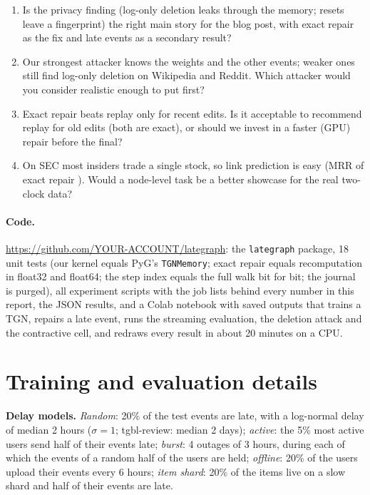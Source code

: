 \documentclass{article}
\newcommand{\CodeURL}{https://github.com/YOUR-ACCOUNT/lategraph}
\begin{document}
\begin{enumerate}
\item Is the privacy finding (log-only deletion leaks through the memory; resets leave a fingerprint) the right main story for
  the blog post, with exact repair as the fix and late events as a secondary result?
\item Our strongest attacker knows the weights and the other events; weaker ones still find log-only deletion on Wikipedia
  and Reddit. Which attacker would you consider realistic enough to put first?
\item Exact repair beats replay only for recent edits. Is it acceptable to recommend replay for old edits (both are exact),
  or should we invest in a faster (GPU) repair before the final?
\item On SEC most insiders trade a single stock, so link prediction is easy (MRR of exact repair \SecExactMrr). Would a
  node-level task be a better showcase for the real two-clock data?
\end{enumerate}

\paragraph{Code.} \url{\CodeURL}: the \texttt{lategraph} package, 18 unit tests (our kernel equals PyG's \texttt{TGNMemory};
exact repair equals recomputation in float32 and float64; the step index equals the full walk bit for bit; the journal is
purged), all experiment scripts with the job lists behind every number in this report, the JSON results, and a Colab notebook
with saved outputs that trains a TGN, repairs a late event, runs the streaming evaluation, the deletion attack and the
contractive cell, and redraws every result in about 20 minutes on a CPU.


\small

\normalsize

\newpage
\appendix

\section{Training and evaluation details}
\label{app:details}

\textbf{Delay models.} \emph{Random}: 20\% of the test events are late, with a log-normal delay of median 2 hours ($\sigma=1$;
tgbl-review: median 2 days); \emph{active}: the 5\% most active users send half of their events late; \emph{burst}: 4 outages
of 3 hours, during each of which the events of a random half of the users are held; \emph{offline}: 20\% of the users upload
their events every 6 hours; \emph{item shard}: 20\% of the items live on a slow shard and half of their events are late.
\end{document}

